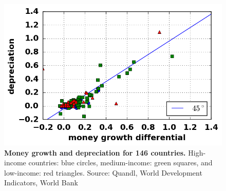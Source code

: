 \begin{figure}[h]
\caption{\label{fig_moneyDifferentialDepreciationOpen} \textbf{Money growth and depreciation for 146 countries.} High-income countries: blue circles, medium-income: green squares, and low-income: red triangles. {\tiny Source: Quandl, World Development Indicators, World Bank}}
\hspace*{-.5cm}\includegraphics[height = 7.cm]{./png/fig_moneyDifferentialDepreciationOpen.png}
\end{figure}